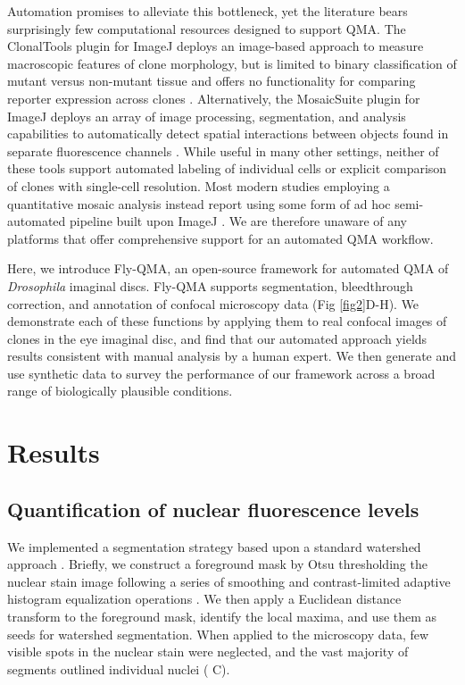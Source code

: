 \documentclass[10pt,letterpaper]{article}
\begin{document}
Automation promises to alleviate this bottleneck, yet the literature bears surprisingly few computational resources designed to support QMA. The ClonalTools plugin for ImageJ deploys an image-based approach to measure macroscopic features of clone morphology, but is limited to binary classification of mutant versus non-mutant tissue and offers no functionality for comparing reporter expression across clones \cite{Mort2009}. Alternatively, the MosaicSuite plugin for ImageJ deploys an array of image processing, segmentation, and analysis capabilities to automatically detect spatial interactions between objects found in separate fluorescence channels \cite{Helmuth2010,Shivanandan2013}. While useful in many other settings, neither of these tools support automated labeling of individual cells or explicit comparison of clones with single-cell resolution. Most modern studies employing a quantitative mosaic analysis instead report using some form of ad hoc semi-automated pipeline built upon ImageJ \cite{Dai2017,Ghiglione2018,Li2018}. We are therefore unaware of any platforms that offer comprehensive support for an automated QMA workflow.

Here, we introduce Fly-QMA, an open-source framework for automated QMA of \textit{Drosophila} imaginal discs. Fly-QMA supports segmentation, bleedthrough correction, and annotation of confocal microscopy data (Fig \ref{fig2}D-H). We demonstrate each of these functions by applying them to real confocal images of clones in the eye imaginal disc, and find that our automated approach yields results consistent with manual analysis by a human expert. We then generate and use synthetic data to survey the performance of our framework across a broad range of biologically plausible conditions.


\section*{Results}

\subsection*{Quantification of nuclear fluorescence levels}
\label{ch:segmentation}

We implemented a segmentation strategy based upon a standard watershed approach \cite{VanderWalt2014}. Briefly, we construct a foreground mask by Otsu thresholding the nuclear stain image following a series of smoothing and contrast-limited adaptive histogram equalization operations \cite{NobuyukiOtsu1979,VanderWalt2014}. We then apply a Euclidean distance transform to the foreground mask, identify the local maxima, and use them as seeds for watershed segmentation. When applied to the microscopy data, few visible spots in the nuclear stain were neglected, and the vast majority of segments outlined individual nuclei ( C).
\end{document}
